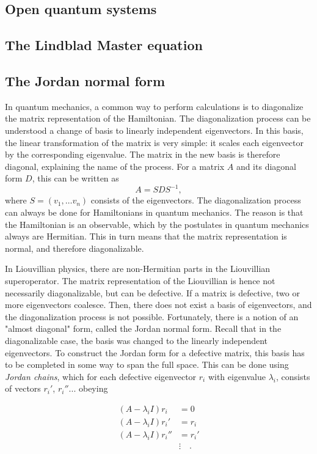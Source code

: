 \documentclass[../main.tex]{subfiles}
\begin{document}
\subsection{Open quantum systems}
\subsection{The Lindblad Master equation}
\subsection{The Jordan normal form}
In quantum mechanics, a common way to perform calculations is to diagonalize the matrix representation of the Hamiltonian. The diagonalization process can be understood a change of basis to linearly independent eigenvectors. In this basis, the linear transformation of the matrix is very simple: it scales each eigenvector by the corresponding eigenvalue. The matrix in the new basis is therefore diagonal, explaining the name of the process. For a matrix $A$ and its diagonal form $D$, this can be written as 
\begin{equation}
A = SDS^{-1},
\end{equation}
where $S = (v_1, \dots v_n)$ consists of the eigenvectors. The diagonalization process can always be done for Hamiltonians in quantum mechanics. The reason is that the Hamiltonian is an observable, which by the postulates in quantum mechanics always are Hermitian. This in turn means that the matrix representation is normal, and therefore diagonalizable.

In Liouvillian physics, there are non-Hermitian parts in the Liouvillian superoperator. The matrix representation of the Liouvillian is hence not necessarily diagonalizable, but can be defective. If a matrix is defective, two or more eigenvectors coalesce. Then, there does not exist a basis of eigenvectors, and the diagonalization process is not possible. Fortunately, there is a notion of an "almost diagonal" form, called the Jordan normal form. Recall that in the diagonalizable case, the basis was changed to the linearly independent eigenvectors. To construct the Jordan form for a defective matrix, this basis has to be completed in some way to span the full space. This can be done using \textit{Jordan chains}, which for each defective eigenvector $r_i$ with eigenvalue $\lambda_i$, consists of vectors $r_i'$, $r_i'' ...$ obeying

\begin{equation}
\begin{aligned}
    (A-\lambda_iI)r_i &= 0 \\
    (A-\lambda_iI)r_i' &= r_i \\
    (A-\lambda_iI)r_i'' &= r_i' \\
    &\vdots \quad.
\end{aligned}
\end{equation}
\end{document}
